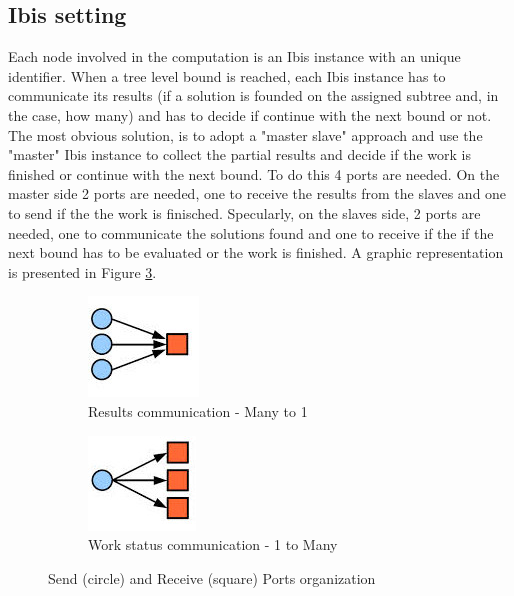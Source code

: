 \documentclass[a4paper]{article}
\begin{document}
\subsection{Ibis setting}
\label{sec:ibis_setting}
Each node involved in the computation is an Ibis instance with an unique identifier.
When a tree level bound is reached, each Ibis instance has to communicate its results (if a solution is founded on the assigned subtree and, in the case, how many) and has to decide if continue with the next bound or not. The most obvious solution, is to adopt a "master slave" approach and use the "master" Ibis instance to collect the partial results and decide if the work is finished or continue with the next bound. To do this 4 ports are needed. On the master side 2 ports are needed, one to receive the results from the slaves and one to send if the  the work is finisched. Specularly, on the slaves side, 2 ports are needed, one to communicate the solutions found and one to receive if the if the next bound has to be evaluated or the work is finished. A graphic representation is presented in Figure \ref{fig:ports}.

\begin{figure}
\begin{subfigure}{0.5\textwidth}
\centering
\includegraphics[width=0.5\linewidth]{results}
\caption{Results communication - Many to 1} \label{fig:ca}
\end{subfigure}
\hspace*{\fill} %
\begin{subfigure}{0.5\textwidth}
\centering
\includegraphics[width=0.5\linewidth]{continue}
\caption{Work status communication - 1 to Many} \label{fig:cb}
\end{subfigure}
\caption{Send (circle) and Receive (square) Ports organization} \label{fig:ports}
\end{figure}
\FloatBarrier


\printbibliography 
\end{document}
